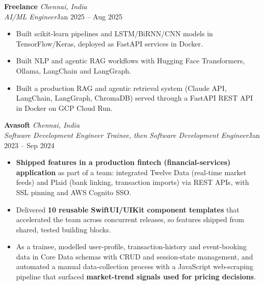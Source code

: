 \documentclass[a4paper,11pt]{article}
\newcommand{\role}[4]{%
  \textbf{#1}{\color{muted}\,\textperiodcentered\,\textit{#2}}\\
  \textit{#4}\hfill{\color{muted}#3}\par}
\newcommand{\gap}{\vspace{5pt}}
\newcommand{\num}[1]{\textbf{#1}}   %
\begin{document}
\gap
{}
\role{Freelance}{Chennai, India}{Jan 2025 – Aug 2025}{AI/ML Engineer}
\begin{itemize}
  \item Built scikit-learn pipelines and LSTM/BiRNN/CNN models in TensorFlow/Keras, deployed as FastAPI services in Docker.
  \item Built NLP and agentic RAG workflows with Hugging Face Transformers, Ollama, LangChain and LangGraph.
  \item Built a production RAG and agentic retrieval system (Claude API, LangChain, LangGraph, ChromaDB) served through a FastAPI REST API in Docker on GCP Cloud Run.
\end{itemize}
\gap
{}
\role{Avasoft}{Chennai, India}{Jan 2023 – Sep 2024}{Software Development Engineer Trainee, then Software Development Engineer}
\begin{itemize}
  \item \num{Shipped features in a production fintech (financial-services) application} as part of a team: integrated Twelve Data (real-time market feeds) and Plaid (bank linking, transaction imports) via REST APIs, with SSL pinning and AWS Cognito SSO.
  \item Delivered \num{10 reusable SwiftUI/UIKit component templates} that accelerated the team across concurrent releases, so features shipped from shared, tested building blocks.
  \item As a trainee, modelled user-profile, transaction-history and event-booking data in Core Data schemas with CRUD and session-state management, and automated a manual data-collection process with a JavaScript web-scraping pipeline that surfaced \num{market-trend signals used for pricing decisions}.
\end{itemize}
\end{document}
